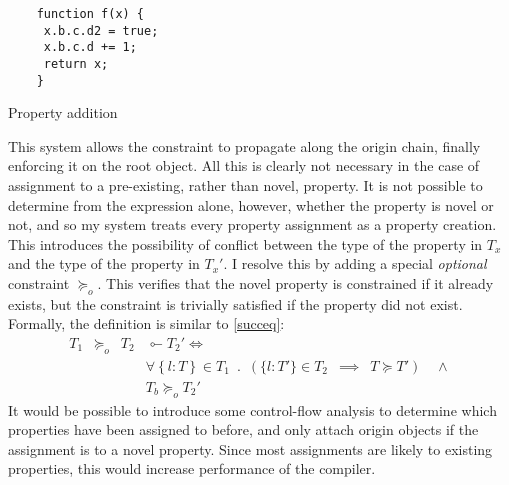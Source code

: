 \documentclass[12pt,a4paper,twoside,openright]{report}
\newcommand*{\orig}{\ensuremath{\!\multimapinv\!}}
\begin{document}
\begin{program}[t]
 \centering
 \begin{minipage}[b]{0.45\linewidth}
 	\begin{verbatim}
	function f(x) {
	 x.b.c.d2 = true;
	 x.b.c.d += 1;
	 return x;
	}	
 	\end{verbatim}
 	\vspace{23mm}
 \end{minipage}
 \quad
 \begin{minipage}[b]{0.45\linewidth}
 \end{minipage}
 \caption{Property addition}\label{lst:propAdd}
\end{program}

This system allows the constraint to propagate along the origin chain, finally
enforcing it on the root object. All this is clearly not necessary in the case
of assignment to a pre-existing, rather than novel, property. It is not
possible to determine from the expression alone, however, whether the property
is novel or not, and so my system treats every property assignment as a
property creation. This introduces the possibility of conflict between the type
of the property in $T_x$ and the type of the property in $T_x'$. I resolve this
by adding a special \textit{optional} constraint $\succeq_o$. This verifies
that the novel property is constrained if it already exists, but the constraint
is trivially satisfied if the property did not exist. Formally, the definition
is similar to
\ref{succeq}:
\begin{equation}
 \begin{split}
	T_1\enspace \succeq_o\enspace T_2&\orig T_2' \iff \\
	& \forall \left\{l: T\right\} \in T_1 \enspace.\enspace (\{l: T'\}\in T_2\enspace \implies \enspace T \succeq T') \quad\land \\
	& T_b \succeq_o T_2'
 \end{split}
 \label{succeqo}
\end{equation}
It would be possible to introduce some control-flow analysis to determine which 
properties have been assigned to before, and only attach origin objects if the
assignment is to a novel property. Since most assignments are likely to existing 
properties, this would increase performance of the compiler.
\end{document}
